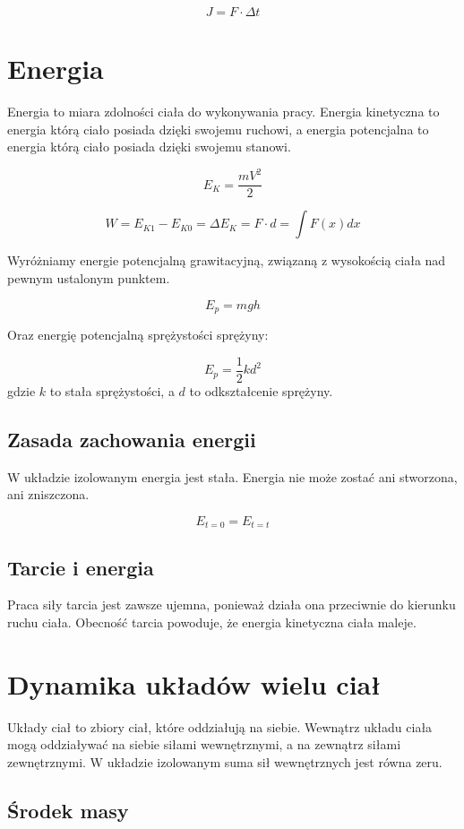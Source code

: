 \documentclass{../notatki}
\begin{document}
$$
J = F \cdot \Delta t
$$

\section{Energia}

Energia to miara zdolności ciała do wykonywania pracy. Energia kinetyczna to
energia którą ciało posiada dzięki swojemu ruchowi, a energia potencjalna to
energia którą ciało posiada dzięki swojemu stanowi.

$$
E_K = \frac{mV^2}{2}
$$

$$
W = E_{K1} - E_{K0} = \Delta E_K = F \cdot d = \int F(x) dx
$$

Wyróżniamy energie potencjalną grawitacyjną, związaną z wysokością ciała nad
pewnym ustalonym punktem.

$$
E_p = mgh
$$

Oraz energię potencjalną sprężystości sprężyny:

$$
E_p = \frac{1}{2}kd^2
$$
gdzie $k$ to stała sprężystości, a $d$ to odkształcenie sprężyny.

\subsection{Zasada zachowania energii}

W układzie izolowanym energia jest stała. Energia nie może zostać ani stworzona,
ani zniszczona.

$$
E_{t=0} = E_{t=t}
$$

\subsection{Tarcie i energia}

Praca siły tarcia jest zawsze ujemna, ponieważ działa ona przeciwnie do kierunku
ruchu ciała. Obecność tarcia powoduje, że energia kinetyczna ciała maleje.

\section{Dynamika układów wielu ciał}

Układy ciał to zbiory ciał, które oddziałują na siebie. Wewnątrz układu ciała
mogą oddziaływać na siebie siłami wewnętrznymi, a na zewnątrz siłami
zewnętrznymi. W układzie izolowanym suma sił wewnętrznych jest równa zeru.

\subsection{Środek masy}
\end{document}
